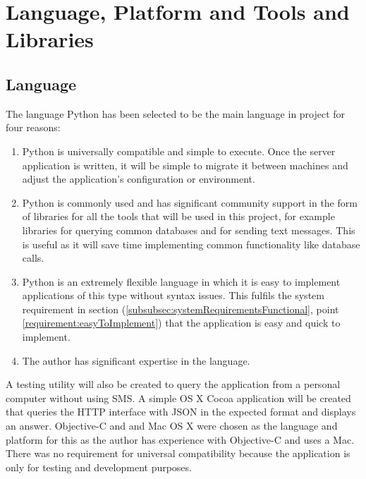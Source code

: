 \documentclass[authoryearcitations]{UoYCSproject}
\begin{document}
\section{Language, Platform and Tools and Libraries}
\subsection{Language}
\label{section:designLanguage}
The language Python has been selected to be the main language in project for four reasons:
\begin{enumerate}
  \item Python is universally compatible and simple to execute.  Once the server application is written, it will be simple to migrate it between machines and adjust the application's configuration or environment.
  \item Python is commonly used and has significant community support  in the form of libraries for all the tools that will be used in this project, for example libraries for querying common databases and for sending text messages.  This is useful as it will save time implementing common functionality like database calls.
  \item Python is an extremely flexible language in which it is easy to implement applications of this type without syntax issues.  This fulfils the system requirement in section (\ref{subsubsec:systemRequirementsFunctional}, point \ref{requirement:easyToImplement}) that the application is easy and quick to implement.
  \item The author has significant expertise in the language.
\end{enumerate}

A testing utility will also be created to query the application from a personal computer without using SMS.  A simple OS X Cocoa application will be created that queries the HTTP interface with JSON in the expected format and displays an answer.  Objective-C and and Mac OS X were chosen as the language and platform for this as the author has experience with Objective-C and uses a Mac.  There was no requirement for universal compatibility because the application is only for testing and development purposes.
\end{document}
